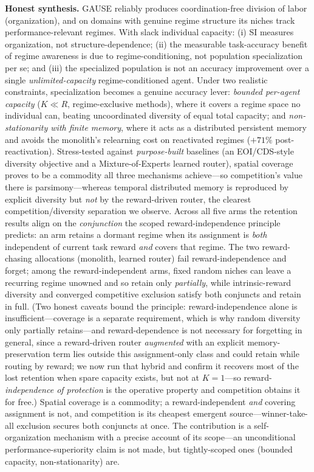 \documentclass[11pt,a4paper]{article}
\theoremstyle{definition}
\theoremstyle{plain}
\begin{document}
\begin{keypoint}
\textbf{Honest synthesis.} GAUSE reliably produces coordination-free
division of labor (organization), and on domains with genuine regime structure its
niches track performance-relevant regimes. With slack individual capacity:
(i) SI measures organization, not structure-dependence; (ii) the measurable
task-accuracy benefit of regime awareness is due to regime-conditioning, not
population specialization per se; and (iii) the specialized population is not an
accuracy improvement over a single \emph{unlimited-capacity} regime-conditioned
agent. Under two realistic constraints, specialization becomes a genuine accuracy
lever: \emph{bounded per-agent capacity} ($K \ll R$, regime-exclusive methods),
where it covers a regime space no individual can, beating uncoordinated diversity
of equal total capacity; and \emph{non-stationarity with finite memory}, where it
acts as a distributed persistent memory and avoids the monolith's relearning cost
on reactivated regimes ($+71\%$ post-reactivation). Stress-tested against
\emph{purpose-built} baselines (an EOI/CDS-style diversity objective and a
Mixture-of-Experts learned router), spatial coverage proves to be a commodity all
three mechanisms achieve---so competition's value there is parsimony---whereas
temporal distributed memory is reproduced by explicit diversity but \emph{not} by
the reward-driven router, the clearest competition/diversity separation we observe.
Across all five arms the retention results align on the \emph{conjunction} the
scoped reward-independence principle predicts: an arm retains a dormant regime when
its assignment is \emph{both} independent of current task reward \emph{and} covers
that regime. The two reward-chasing allocations (monolith, learned router) fail
reward-independence and forget; among the reward-independent arms, fixed random
niches can leave a recurring regime unowned and so retain only \emph{partially},
while intrinsic-reward diversity and converged competitive exclusion satisfy both
conjuncts and retain in full. (Two honest caveats bound the principle:
reward-independence alone is insufficient---coverage is a separate requirement, which
is why random diversity only partially retains---and reward-dependence is not
necessary for forgetting in general, since a reward-driven router \emph{augmented}
with an explicit memory-preservation term lies outside this assignment-only class and
could retain while routing by reward; we now run that hybrid and confirm it recovers
most of the lost retention when spare capacity exists, but not at $K{=}1$---so
reward-\emph{independence of protection} is the operative property and competition
obtains it for free.) Spatial coverage is a commodity; a reward-independent
\emph{and} covering assignment is not, and competition is its cheapest emergent
source---winner-take-all exclusion secures both conjuncts at once.
The contribution is a self-organization mechanism with a precise account of its
scope---an unconditional performance-superiority claim is not made, but
tightly-scoped ones (bounded capacity, non-stationarity) are.
\end{keypoint}
\end{document}
